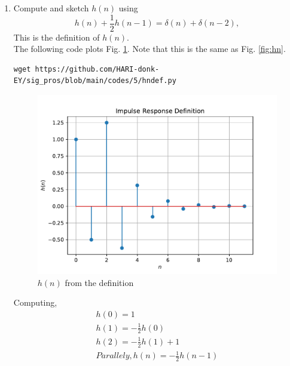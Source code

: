 \documentclass[journal,12pt,twocolumn]{IEEEtran}
\renewcommand\thesection{\arabic{section}}
\begin{document}
\begin{enumerate}[label=\thesection.\arabic*]
\item 
Compute and sketch $h(n)$ using 
\begin{equation}
\label{eq:iir_filter_h}
h(n) + \frac{1}{2}h(n-1) = \delta(n) + \delta(n-2), 
\end{equation}
%
This is the definition of $h(n)$.
\\
\solution The following code plots Fig. \ref{fig:hndef}. Note that this is the same as Fig. 
\ref{fig:hn}. 
%
\begin{lstlisting}
wget https://github.com/HARI-donk-EY/sig_pros/blob/main/codes/5/hndef.py
\end{lstlisting}
\begin{figure}[!ht]
\centering
\includegraphics[width=\columnwidth]{./figs/hndef}
\caption{$h(n)$ from the definition}
\label{fig:hndef}
\end{figure}
Computing,
\begin{align*}
h(0)=1\\
h(1)=-\frac{1}{2}h(0)\\
h(2)=-\frac{1}{2}h(1)+1\\
Parallely, h(n)=-\frac{1}{2}h(n-1)\\
\end{align*}


\end{enumerate}
\end{document}
